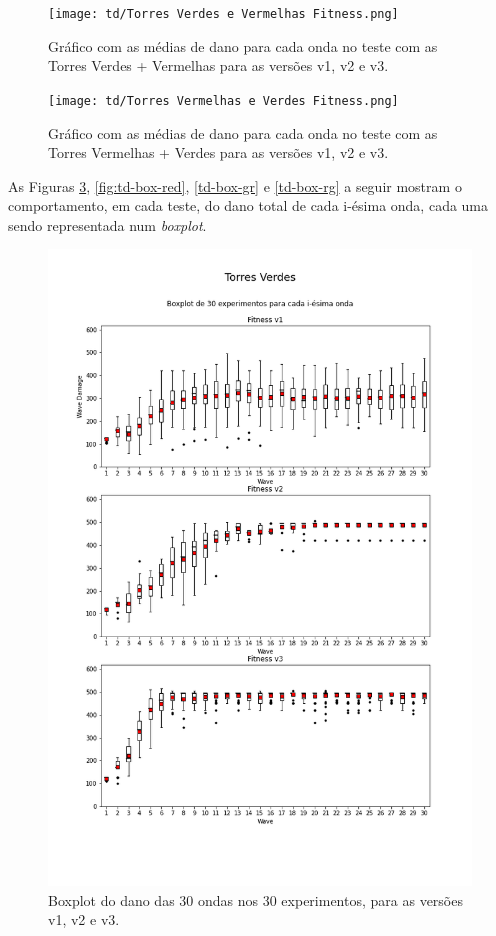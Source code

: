 \begin{figure}[H]
  \centering
  \texttt{[image: td/Torres Verdes e Vermelhas Fitness.png]}
  \caption{Gráfico com as médias de dano para cada onda no teste com as Torres Verdes + Vermelhas para as versões v1, v2 e v3.}
  \label{fig:fit-td-verd-verm}
\end{figure}

\begin{figure}[H]
  \centering
  \texttt{[image: td/Torres Vermelhas e Verdes Fitness.png]}
  \caption{Gráfico com as médias de dano para cada onda no teste com as Torres Vermelhas + Verdes para as versões v1, v2 e v3.}
  \label{fig:fit-td-verm-verd}
\end{figure}

As Figuras \ref{fig:td-box-green}, \ref{fig:td-box-red}, \ref{td-box-gr} e \ref{td-box-rg} a seguir mostram o comportamento, em cada teste, do dano total de cada i-ésima onda, cada uma sendo representada num \textit{boxplot}.

\vfill
\pagebreak

\begin{figure}[H]
  \centering
  \includegraphics[width=1.1\textwidth]{figuras/td/boxplot Torres Verdes.png}
  \caption{Boxplot do dano das 30 ondas nos 30 experimentos, para as versões v1, v2 e v3.}
  \label{fig:td-box-green}
\end{figure}

